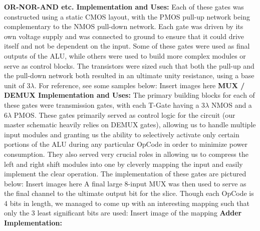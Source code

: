 \documentclass[12pt]{article}
\begin{document}
	\textbf{OR-NOR-AND etc. Implementation and Uses:}
	\newline \newline
	Each of these gates was constructed using a static CMOS layout, with the PMOS pull-up 
	network being complementary to the NMOS pull-down network. Each gate was driven by
	its own voltage supply and was connected to ground to ensure that it could drive itself and
	not be dependent on the input. Some of these gates were used as final outputs of the ALU,
	while others were used to build more complex modules or serve as control blocks. The 
	transistors were sized such that both the pull-up and the pull-down network
	both resulted in an ultimate unity resistance, using a base unit of 3$\lambda$. 
	For reference, see some samples below:
	\newline \newline
	Insert images here 
	\newline \newline
	\textbf{MUX / DEMUX Implementation and Uses:}
	\newline \newline
	The primary building blocks for each of these gates were transmission gates, with each 
	T-Gate having a 3$\lambda$ NMOS and a 6$\lambda$ PMOS. These gates primarily served
	as control logic for the circuit (our master schematic heavily relies on DEMUX gates), 
	allowing us to handle multiple input modules and granting us the ability to selectively 
	activate only certain portions of the ALU during any particular OpCode
	in order to minimize power consumption. They also served very crucial roles in allowing us to
	compress the left and right shift modules into one by cleverly mapping the input and easily 
	implement the clear operation. The implementation of these gates are pictured below:
	\newline \newline
	Insert images here
	\newline \newline
	A final large 8-input MUX was then used to serve as the final channel to the ultimate output 
	bit for the slice. Though each OpCode is 4 bits in length, we managed to come up with an 
	interesting mapping such that only the 3 least significant bits are used:
	\newline \newline
	Insert image of the mapping
	\newline \newline
	\textbf{Adder Implementation:}
	\newline \newline
\end{document}
